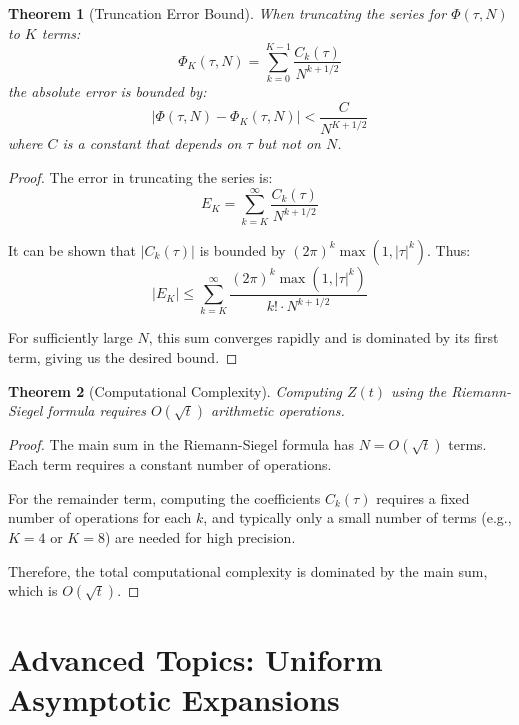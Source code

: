 \documentclass{article}
\newtheorem{theorem}{Theorem}
\begin{document}
\begin{theorem}[Truncation Error Bound]
When truncating the series for $\Phi(\tau, N)$ to $K$ terms:
\[
\Phi_K(\tau, N) = \sum_{k=0}^{K-1} \frac{C_k(\tau)}{N^{k+1/2}}
\]
the absolute error is bounded by:
\[
\left|\Phi(\tau, N) - \Phi_K(\tau, N)\right| < \frac{C}{N^{K+1/2}}
\]
where $C$ is a constant that depends on $\tau$ but not on $N$.
\end{theorem}

\begin{proof}
The error in truncating the series is:
\[
E_K = \sum_{k=K}^{\infty} \frac{C_k(\tau)}{N^{k+1/2}}
\]

It can be shown that $|C_k(\tau)|$ is bounded by $(2\pi)^k \max(1, |\tau|^k)$. Thus:
\[
|E_K| \leq \sum_{k=K}^{\infty} \frac{(2\pi)^k \max(1, |\tau|^k)}{k! \cdot N^{k+1/2}}
\]

For sufficiently large $N$, this sum converges rapidly and is dominated by its first term, giving us the desired bound.
\end{proof}

\begin{theorem}[Computational Complexity]
Computing $Z(t)$ using the Riemann-Siegel formula requires $O(\sqrt{t})$ arithmetic operations.
\end{theorem}

\begin{proof}
The main sum in the Riemann-Siegel formula has $N = O(\sqrt{t})$ terms. Each term requires a constant number of operations.

For the remainder term, computing the coefficients $C_k(\tau)$ requires a fixed number of operations for each $k$, and typically only a small number of terms (e.g., $K = 4$ or $K = 8$) are needed for high precision.

Therefore, the total computational complexity is dominated by the main sum, which is $O(\sqrt{t})$.
\end{proof}

\section{Advanced Topics: Uniform Asymptotic Expansions}
\end{document}
